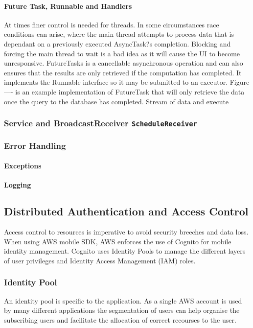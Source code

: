 \documentclass[a4paper, 11pt]{article}
\begin{document}
\paragraph{ Future Task, Runnable and Handlers } At times finer control is needed for threads. In some circumstances race conditions can arise, where the main thread attempts to process data that is dependant on a previously executed AsyncTask?s completion. Blocking and forcing the main thread to wait is a bad idea as it will cause the UI to become unresponsive. FutureTasks is a cancellable asynchronous operation and can also ensures that the results are only retrieved if the computation has completed. It implements the Runnable interface so it may be submitted to an executor. Figure ---- is an example implementation of FutureTask that will only retrieve the data once the query to the database has completed. Stream of data and execute


\subsubsection{Service and BroadcastReceiver 
\texttt{ScheduleReceiver}
}


\subsubsection{Error Handling}
\paragraph{Exceptions}
\paragraph{Logging}


\subsection{Distributed Authentication and Access Control}

Access control to resources is imperative to avoid security breeches and data loss. When using AWS mobile SDK, AWS enforces the use of Cognito for mobile identity management. Cognito uses Identity Pools to manage the different layers of user privileges and Identity Access Management (IAM) roles.

\subsubsection{Identity Pool}
An identity pool is specific to the application. As a single AWS account is used by many different applications the segmentation of users can help organise the subscribing users and facilitate the allocation of correct recourses to the user. 
\end{document}
